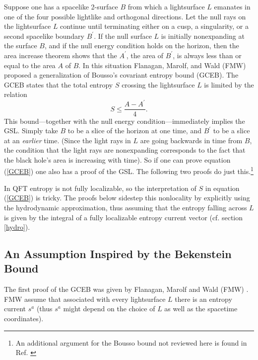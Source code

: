 \documentclass[12pt]{article}
\begin{document}
Suppose one has a spacelike 2-surface $B$ from which a lightsurface $L$ emanates in one of the four possible lightlike and orthogonal directions.  Let the null rays on the lightsurface $L$ continue until terminating either on a cusp, a singularity, or a second spacelike boundary $B^{\prime}$.  If the null surface $L$ is initially nonexpanding at the surface $B$, and if the null energy condition holds on the horizon, then the area increase theorem shows that the $A^\prime$, the area of $B^\prime$, is always less than or equal to the area $A$ of $B$.  In this situation Flanagan, Marolf, and Wald (FMW) proposed a generalization of Bousso's covariant entropy bound (GCEB).  The GCEB states that the total entropy $S$ crossing the lightsurface $L$ is limited by the relation
\begin{equation}\label{GCEB}
S \le \frac{A - A^{\prime}}{4}.
\end{equation}
This bound---together with the null energy condition---immediately implies the GSL.  Simply take $B$ to be a slice of the horizon at one time, and $B^\prime$ to be a slice at an \emph{earlier} time.  (Since the light rays in $L$ are going backwards in time from $B$, the condition that the light rays are nonexpanding corresponds to the fact that the black hole's area is increasing with time).  So if one can prove equation (\ref{GCEB}) one also has a proof of the GSL.  The following two proofs do just this.\footnote{An additional argument for the Bousso bound not reviewed here is found in Ref. \cite{pesci07}}

In QFT entropy is not fully localizable, so the interpretation of $S$ in equation (\ref{GCEB}) is tricky.  The proofs below sidestep this nonlocality by explicitly using the hydrodynamic approximation, thus assuming that the entropy falling across $L$ is given by the integral of a fully localizable entropy current vector (cf. section \ref{hydro}).

\subsection{An Assumption Inspired by the Bekenstein Bound}\label{FMW}

The first proof of the GCEB was given by Flanagan, Marolf and Wald (FMW) \cite{FMW00}.  FMW assume that associated with every lightsurface $L$ there is an entropy current $s^a$ (thus $s^a$ might depend on the choice of $L$ as well as the spacetime coordinates).
\end{document}

